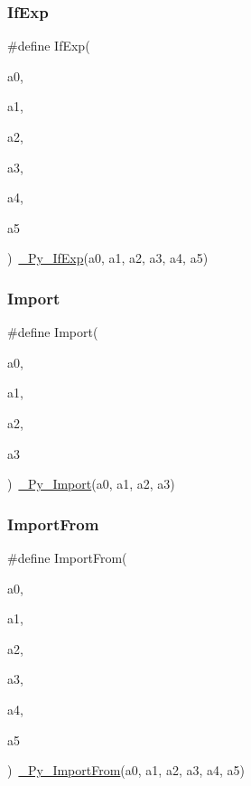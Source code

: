 \mbox{\label{_python-ast_8h_ad3500934a5f5005efe3561ccec6e1610}} 
\subsubsection{\texorpdfstring{IfExp}{IfExp}}
{\footnotesize\ttfamily \#define If\+Exp(\begin{DoxyParamCaption}\item[{}]{a0,  }\item[{}]{a1,  }\item[{}]{a2,  }\item[{}]{a3,  }\item[{}]{a4,  }\item[{}]{a5 }\end{DoxyParamCaption})~\mbox{\hyperlink{_python-ast_8h_a912e7818e9f2abb4d541e6fb1cba269e}{\+\_\+\+Py\+\_\+\+If\+Exp}}(a0, a1, a2, a3, a4, a5)}

\mbox{\label{_python-ast_8h_abbf91a20d51b8107b75aede82d50726b}} 
\subsubsection{\texorpdfstring{Import}{Import}}
{\footnotesize\ttfamily \#define Import(\begin{DoxyParamCaption}\item[{}]{a0,  }\item[{}]{a1,  }\item[{}]{a2,  }\item[{}]{a3 }\end{DoxyParamCaption})~\mbox{\hyperlink{_python-ast_8h_a023382d2810dee50a2b0f8185043b76d}{\+\_\+\+Py\+\_\+\+Import}}(a0, a1, a2, a3)}

\mbox{\label{_python-ast_8h_a3314d17e8fe4cdbe5895a90e7caecfc5}} 
\subsubsection{\texorpdfstring{ImportFrom}{ImportFrom}}
{\footnotesize\ttfamily \#define Import\+From(\begin{DoxyParamCaption}\item[{}]{a0,  }\item[{}]{a1,  }\item[{}]{a2,  }\item[{}]{a3,  }\item[{}]{a4,  }\item[{}]{a5 }\end{DoxyParamCaption})~\mbox{\hyperlink{_python-ast_8h_a78ee6afb979ce2e9d7c57aface1dc7f4}{\+\_\+\+Py\+\_\+\+Import\+From}}(a0, a1, a2, a3, a4, a5)}

